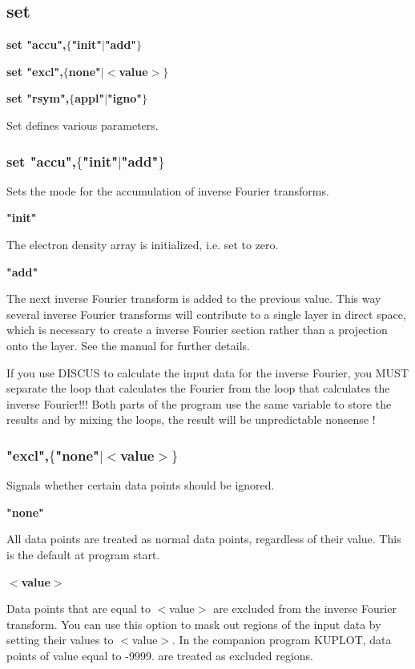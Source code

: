 \subsection*{set}
{\bf set "accu",$ \{$"init"$| $"add"$\} $ \par }
{\bf set "excl",$ \{$none"$| $$ <$value$> $$\} $ \par }
{\bf set "rsym",$ \{$appl"$| $"igno"$\} $ \par }
\par
\vspace{3pt}
Set defines various parameters. 
\par
\subsubsection{set "accu",$ \{$"init"$| $"add"$\} $}
\par
Sets the mode for the accumulation of inverse Fourier transforms. 
\par
{\bf "init" \par }
\vspace{3pt}
The electron density array is initialized, i.e. set to zero. 
\par
{\bf "add" \par }
\vspace{3pt}
The next inverse Fourier transform is added to the previous value. 
This way several inverse Fourier transforms will contribute to a single 
layer in direct space, which is necessary to create a inverse Fourier 
section rather than a projection onto the layer. See the manual for 
further details. 
\par
If you use DISCUS to calculate the input data for the inverse Fourier, 
you MUST separate the loop that calculates the Fourier from the loop 
that calculates the inverse Fourier!!! Both parts of the program use 
the same variable to store the results and by mixing the loops, the 
result will be unpredictable nonsense ! 
\par
\subsubsection{"excl",$ \{$"none"$| $$ <$value$> $$\} $}
\par
Signals whether certain data points should be ignored. 
\par
{\bf "none" \par }
\vspace{3pt}
All data points are treated as normal data points, regardless of their 
value. 
This is the default at program start. 
\par
{\bf $ <$value$> $ \par }
\vspace{3pt}
Data points that are equal to $ <$value$> $ are excluded from the inverse Fourier 
transform. You can use this option to mask out regions of the input 
data by setting their values to $ <$value$> $. 
In the companion program KUPLOT, data points of value equal to -9999. are 
treated as excluded regions. 
\par
